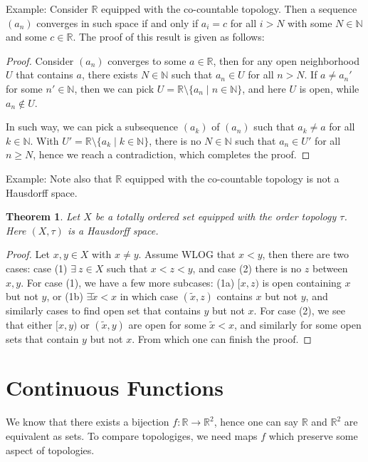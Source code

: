 \documentclass[11pt]{book}
\theoremstyle{break}
\theoremstyle{break}
\newtheorem{thm}{Theorem}[section]
\newcommand{\R}{\mathbb{R}}
\newcommand{\N}{\mathbb{N}}
\newcommand{\that}[1]{\widetilde{#1}}
\newcommand{\example}{\color{green}Example: \color{black}}
\begin{document}
\example Consider $\R$ equipped with the co-countable topology. Then a sequence $(a_n)$ converges in such space if and only if $a_i = c$ for all $i>N$ with some $N \in \N$ and some $c \in \R$. The proof of this result is given as follows:
\begin{proof}
Consider $(a_n)$ converges to some $a \in \R$, then for any open neighborhood $U$ that contains $a$, there exists $N \in \N$ such that $a_n \in U$ for all $n >N$. If $a\neq a_n' $ for some $n' \in \N$, then we can pick $U  = \R\setminus \{a_n \mid n \in \N\}$, and here $U$ is open, while $a_n \notin U$. 



In such way, we can pick a subsequence $(a_k)$ of $(a_n)$ such that $a_k \neq a$ for all $k \in \N$. With $U' = \R\setminus \{a_{k}\mid k \in \N\}$, there is no $N \in \N$ such that $a_n \in U'$ for all $n \geq N$, hence we reach a contradiction, which completes the proof.   
\end{proof} 

\example Note also that $\R$ equipped with the co-countable topology is not a Hausdorff space.\\

\begin{thm}
Let $X$ be a totally ordered set equipped with the order topology $\tau$. \\Here $(X,\tau)$ is a Hausdorff space. 
\end{thm}
\begin{proof}
Let $x, y\in X$ with $x\neq y$. Assume WLOG that $x<y$, then there are two cases: case (1) $\exists\ z\in X$ such that $x<z<y$, and case (2) there is no $z$ between $x,y$. For case (1), we have a few more subcases: (1a) $[x,z)$ is open containing $x$ but not $y$, or (1b) $\exists \that{x} <x$ in which case $(\that{x}, z)$ contains $x$ but not $y$, and similarly cases to find open set that contains $y$ but not $x$. For case (2), we see that either $[x,y)$ or $(\that{x},y)$ are open for some $\that{x} <x$, and similarly for some open sets that contain $y$ but not $x$. From which one can finish the proof.
\end{proof}
\newpage

\section[Continuous Functions]{\color{red} Continuous Functions \color{black}}
We know that there exists a bijection $f:\R \to \R^2$, hence one can say $\R$ and $\R^2$ are equivalent as sets. To compare topologiges, we need maps $f$ which preserve some aspect of topologies.\\
\end{document}
